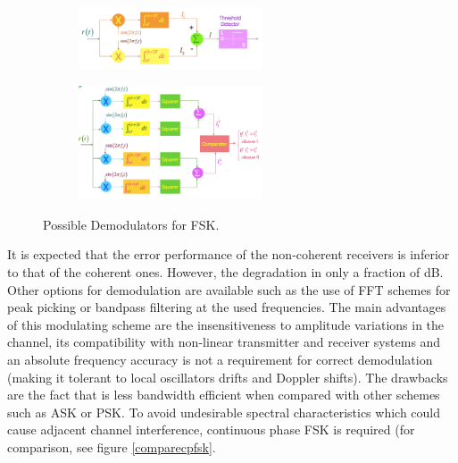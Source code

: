 \documentclass[12pt,a4paper,openright]{article}
\begin{document}
 \begin{figure}[h]
 \centering
\begin{subfigure}[h]{0.9\textwidth}
 \centering
    \includegraphics[width=0.6\textwidth]{fskdem1.pdf}
    \label{coherent}

\end{subfigure}
\quad

\begin{subfigure}[h]{0.9\textwidth}
 \centering
    \includegraphics[width=0.6\textwidth]{fskdem2.pdf}
    \label{noncoherent}
    \end{subfigure}
    \caption{Possible Demodulators for FSK.}
\end{figure}


It is expected that the error performance of the non-coherent receivers is inferior to that of the coherent ones. However, the degradation in only a fraction of dB. Other options for demodulation are available such as the use of FFT schemes for peak picking or bandpass filtering at the used frequencies. 
The main advantages of this modulating scheme are the insensitiveness to amplitude variations in the channel, its compatibility with non-linear transmitter and receiver systems and an absolute frequency accuracy is not a requirement for correct demodulation (making it tolerant to local oscillators drifts and Doppler shifts). The drawbacks are the fact that is less bandwidth efficient when compared with other schemes such as ASK or PSK. To avoid undesirable spectral characteristics which could cause adjacent channel interference, continuous phase FSK is required (for comparison, see figure \ref{comparecpfsk}.
\end{document}
